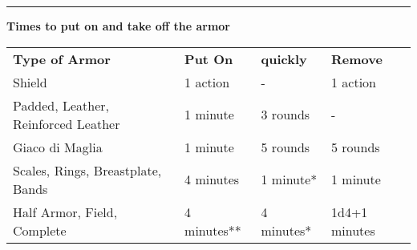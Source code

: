 \documentclass[a4paper,12 pt,openany]{book}
\newcommand{\linex}{\rule{\textwidth}{0.4pt}}
\begin{document}
\begin{textblock*}{15cm}
\linex

\textbf{Times to put on and take off the armor}\\

\begin{tabular}{llll}
\textbf{Type of Armor}& \textbf{Put On} & \textbf{quickly} & \textbf{Remove}\\
Shield & 1 action & - & 1 action\\
Padded, Leather, Reinforced Leather & 1 minute & 3 rounds & - \\
Giaco di Maglia & 1 minute & 5 rounds & 5 rounds\\
Scales, Rings, Breastplate, Bands & 4 minutes & 1 minute{*} & 1 minute\\
Half Armor, Field, Complete & 4 minutes{*}{*}& 4 minutes{*}& 1d4+1 minutes\\
\end{tabular}

\end{textblock*}
\end{document}
